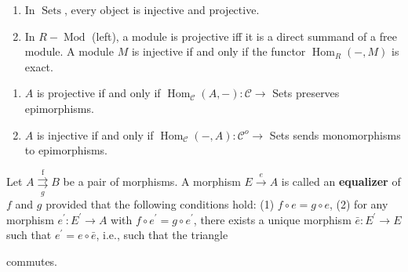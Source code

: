 \begin{example}
    \begin{enumerate}
        \item In $\operatorname{Sets}$, every object is injective and projective.
        \item In $R-\operatorname{Mod}$ (left), a module is projective iff it is a direct summand of a free module. A module $M$ is injective if and only if the functor $\operatorname{Hom}_R(-, M)$ is exact.
    \end{enumerate}
\end{example}

\begin{prop}
\begin{enumerate}
    \item $A$ is projective if and only if $\operatorname{Hom}_\mathcal{C}(A,-): \mathcal{C} \rightarrow$ Sets preserves epimorphisms. 
    \item $A$ is injective if and only if $\operatorname{Hom}_\mathcal{C}(-, A): \mathcal{C}^o \rightarrow$ Sets sends monomorphisms to epimorphisms.
\end{enumerate}
\end{prop}




Let $A \stackrel{\text { f }}{\underset{g}{\rightrightarrows}} B$ be a pair of morphisms. A morphism $E \xrightarrow{e} A$ is called an \textbf{equalizer} of $f$ and $g$ provided that the following conditions hold:
(1) $f \circ e=g \circ e$,
(2) for any morphism $e^{\prime}: E^{\prime} \rightarrow A$ with $f \circ e^{\prime}=g \circ e^{\prime}$, there exists a unique morphism $\bar{e}: E^{\prime} \rightarrow E$ such that $e^{\prime}=e \circ \bar{e}$, i.e., such that the triangle
 commutes.\\

